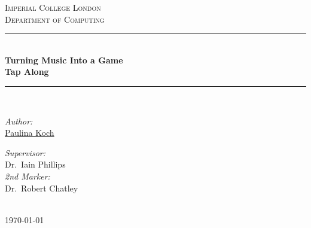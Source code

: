 \documentclass[11pt, twoside]{Thesis} %
\title{\ttitle} %
\begin{document}
\frontmatter %

\fancyhead{} %
\rhead{\thepage} %
\lhead{\thepage} %

\pagestyle{fancy} %

\newcommand{\HRule}{\rule{\linewidth}{0.5mm}} %

\hypersetup{pdfsubject=\subjectname}
\hypersetup{pdfauthor=\authornames}
\hypersetup{pdfkeywords=\keywordnames}


\begin{titlepage}
\begin{center}

\textsc{\LARGE Imperial College London}\\[1.5cm] %
\textsc{\Large Department of Computing}\\[0.5cm] %

\HRule \\[0.4cm] %
{\huge \bfseries Turning Music Into a Game}\\[0.4cm] %
{\huge \bfseries Tap Along}\\[0.4cm] %
\HRule \\[1.5cm] %
 
\begin{minipage}{0.4\textwidth}
\begin{flushleft} \large
\emph{Author:}\\
\href{pak11@doc.ic.ac.uk}{Paulina Koch} %
\end{flushleft}
\end{minipage}
\begin{minipage}{0.4\textwidth}
\begin{flushright} \large
\emph{Supervisor:} \\
Dr.\ Iain Phillips \\ \vspace{20pt}
\emph{2nd Marker:} \\
Dr.\ Robert Chatley
\end{flushright}
\end{minipage}\\[3cm]
 

{\large \today}\\[4cm] %
 
\vfill
\end{center}

\end{titlepage}
\end{document}
